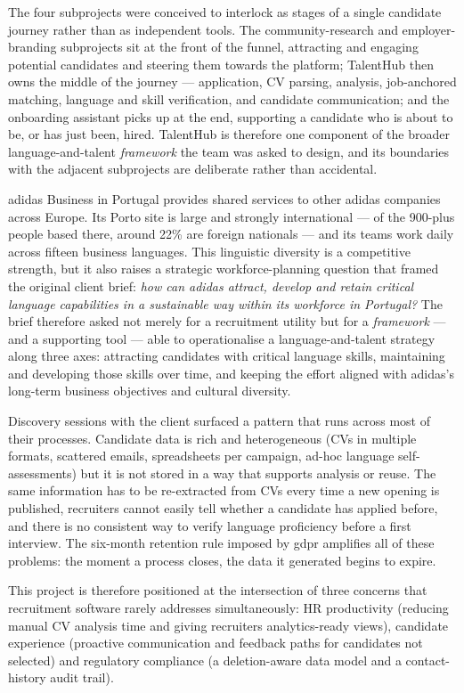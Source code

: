 The four subprojects were conceived to interlock as stages of a single
candidate journey rather than as independent tools. The community-research
and employer-branding subprojects sit at the front of the funnel, attracting
and engaging potential candidates and steering them towards the platform;
TalentHub then owns the middle of the journey --- application, CV parsing,
analysis, job-anchored matching, language and skill verification, and
candidate communication; and the onboarding assistant picks up at the end,
supporting a candidate who is about to be, or has just been, hired. TalentHub
is therefore one component of the broader language-and-talent \emph{framework}
the team was asked to design, and its boundaries with the adjacent subprojects
are deliberate rather than accidental.

adidas Business in Portugal provides shared services to other adidas
companies across Europe. Its Porto site is large and strongly
international --- of the 900-plus people based there, around 22\%
are foreign nationals --- and its teams work daily across fifteen
business languages. This linguistic
diversity is a competitive strength, but it also raises a strategic
workforce-planning question that framed the original client brief:
\textit{how can adidas attract, develop and retain critical language
capabilities in a sustainable way within its workforce in Portugal?} The
brief therefore asked not merely for a recruitment utility but for a
\emph{framework} --- and a supporting tool --- able to operationalise a
language-and-talent strategy along three axes: attracting candidates with
critical language skills, maintaining and developing those skills over time,
and keeping the effort aligned with adidas's long-term business objectives
and cultural diversity.

Discovery sessions with the client surfaced a pattern that runs across most
of their processes. Candidate data is rich and heterogeneous (CVs in
multiple formats, scattered emails, spreadsheets per campaign, ad-hoc
language self-assessments) but it is not stored in a way that supports
analysis or reuse. The same information has to be re-extracted from CVs
every time a new opening is published, recruiters cannot easily tell
whether a candidate has applied before, and there is no consistent way to
verify language proficiency before a first interview. The six-month
retention rule imposed by \gls{gdpr} amplifies all of these problems: the
moment a process closes, the data it generated begins to expire.

This project is therefore positioned at the intersection of three concerns
that recruitment software rarely addresses simultaneously: HR productivity
(reducing manual CV analysis time and giving recruiters analytics-ready
views), candidate experience (proactive communication and feedback paths
for candidates not selected) and regulatory compliance (a deletion-aware
data model and a contact-history audit trail).

